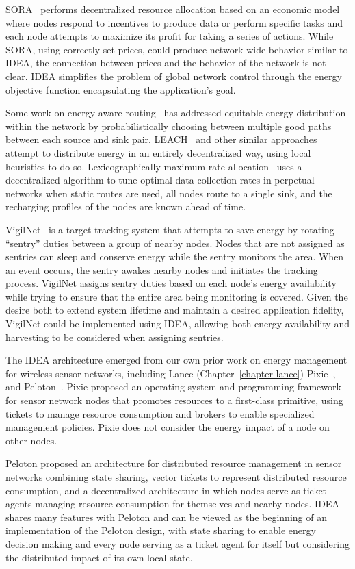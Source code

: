 SORA~\cite{sora-nsdi05} performs decentralized resource allocation based on
an economic model where nodes respond to incentives to produce data or
perform specific tasks and each node attempts to maximize its profit for
taking a series of actions. While SORA, using correctly set prices, could
produce network-wide behavior similar to IDEA, the connection between prices
and the behavior of the network is not clear. IDEA simplifies the problem of
global network control through the energy objective function encapsulating
the application's goal.

Some work on energy-aware routing~\cite{ShahRabaey2002,381685} has addressed
equitable energy distribution within the network by probabilistically
choosing between multiple good paths between each source and sink pair.
LEACH~\cite{leach} and other similar approaches attempt to distribute energy
in an entirely decentralized way, using local heuristics to do so.
Lexicographically maximum rate allocation~\cite{fairrate-sensys08} uses a
decentralized algorithm to tune optimal data collection rates in perpetual
networks when static routes are used, all nodes route to a single sink, and
the recharging profiles of the nodes are known ahead of time.

VigilNet~\cite{vigilnet} is a target-tracking system that attempts to save
energy by rotating ``sentry'' duties between a group of nearby nodes. Nodes
that are not assigned as sentries can sleep and conserve energy while the
sentry monitors the area. When an event occurs, the sentry awakes nearby
nodes and initiates the tracking process. VigilNet assigns sentry duties
based on each node's energy availability while trying to ensure that the
entire area being monitoring is covered. Given the desire both to extend
system lifetime and maintain a desired application fidelity, VigilNet could
be implemented using IDEA, allowing both energy availability and harvesting
to be considered when assigning sentries.

\clearpage

The IDEA architecture emerged from our own prior work on energy management
for wireless sensor networks, including Lance (Chapter~\ref{chapter-lance})
Pixie~\cite{pixie-sensys08}, and Peloton~\cite{peloton-hotos09}. Pixie
proposed an operating system and programming framework for sensor network
nodes that promotes resources to a first-class primitive, using tickets to
manage resource consumption and brokers to enable specialized management
policies. Pixie does not consider the energy impact of a node on other nodes.

Peloton proposed an architecture for distributed resource management in
sensor networks combining state sharing, vector tickets to represent
distributed resource consumption, and a decentralized architecture in which
nodes serve as ticket agents managing resource consumption for themselves and
nearby nodes. IDEA shares many features with Peloton and can be viewed as the
beginning of an implementation of the Peloton design, with state sharing to
enable energy decision making and every node serving as a ticket agent for
itself but considering the distributed impact of its own local state.
